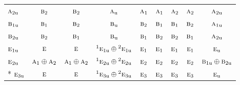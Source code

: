 \documentclass[10pt,a4paper]{article}
\numberwithin{equation}{section}
\newcommand{\irr}[1]{\text{\normalfont\scshape #1}}
\newcommand{\conjpair}[1]{{}^{#1}}
\newcommand{\ptag}[1]{\mathrm{#1}}
\begin{document}
{\begin{longtable}{@{}lcccccccc@{}}
$\irr{a}_{2\ptag{u}}$ & $\irr{b}_{2}$ & $\irr{b}_{2}$ & $\irr{a}_{\ptag{u}}$ & $\irr{a}_{1}$ & $\irr{a}_{1}$ & $\irr{a}_{2}$ & $\irr{a}_{2}$ & $\irr{a}_{2\ptag{u}}$\\
$\irr{b}_{1\ptag{u}}$ & $\irr{b}_{1}$ & $\irr{b}_{2}$ & $\irr{b}_{\ptag{u}}$ & $\irr{b}_{2}$ & $\irr{b}_{1}$ & $\irr{b}_{1}$ & $\irr{b}_{2}$ & $\irr{a}_{1\ptag{u}}$\\
$\irr{b}_{2\ptag{u}}$ & $\irr{b}_{2}$ & $\irr{b}_{1}$ & $\irr{b}_{\ptag{u}}$ & $\irr{b}_{1}$ & $\irr{b}_{2}$ & $\irr{b}_{2}$ & $\irr{b}_{1}$ & $\irr{a}_{2\ptag{u}}$\\
$\irr{e}_{1\ptag{u}}$ & $\irr{e}$ & $\irr{e}$ & $\conjpair{1}\irr{e}_{1\ptag{u}}\oplus \conjpair{2}\irr{e}_{1\ptag{u}}$ & $\irr{e}_{1}$ & $\irr{e}_{1}$ & $\irr{e}_{1}$ & $\irr{e}_{1}$ & $\irr{e}_{\ptag{u}}$\\
$\irr{e}_{2\ptag{u}}$ & $\irr{a}_{1}\oplus \irr{a}_{2}$ & $\irr{a}_{1}\oplus \irr{a}_{2}$ & $\conjpair{1}\irr{e}_{2\ptag{u}}\oplus \conjpair{2}\irr{e}_{2\ptag{u}}$ & $\irr{e}_{2}$ & $\irr{e}_{2}$ & $\irr{e}_{2}$ & $\irr{e}_{2}$ & $\irr{b}_{1\ptag{u}}\oplus \irr{b}_{2\ptag{u}}$\\*
$\irr{e}_{3\ptag{u}}$ & $\irr{e}$ & $\irr{e}$ & $\conjpair{1}\irr{e}_{3\ptag{u}}\oplus \conjpair{2}\irr{e}_{3\ptag{u}}$ & $\irr{e}_{3}$ & $\irr{e}_{3}$ & $\irr{e}_{3}$ & $\irr{e}_{3}$ & $\irr{e}_{\ptag{u}}$\\
\bottomrule\end{longtable}}
\end{document}
